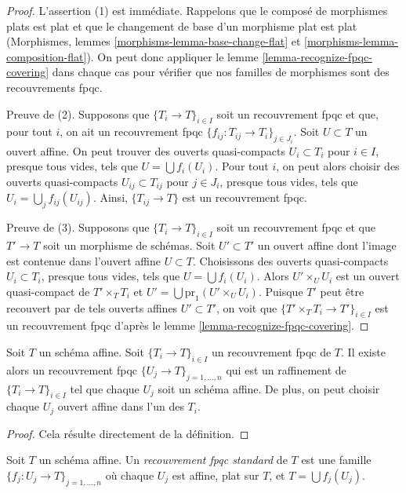 \begin{proof}
L'assertion (1) est immédiate. Rappelons que le composé de morphismes plats
est plat et que le changement de base d'un morphisme plat est plat
(Morphismes, lemmes \ref{morphisms-lemma-base-change-flat} et
\ref{morphisms-lemma-composition-flat}).
On peut donc appliquer le lemme \ref{lemma-recognize-fpqc-covering}
dans chaque cas pour vérifier que nos familles de morphismes sont des recouvrements fpqc.

\medskip\noindent
Preuve de (2). Supposons que $\{T_i \to T\}_{i\in I}$ soit un recouvrement fpqc et que, pour tout
$i$, on ait un recouvrement fpqc $\{f_{ij} : T_{ij} \to T_i\}_{j\in J_i}$.
Soit $U \subset T$ un ouvert affine. On peut trouver
des ouverts quasi-compacts $U_i \subset T_i$ pour $i \in I$, presque tous vides,
tels que $U = \bigcup f_i(U_i)$. Pour tout $i$, on peut alors choisir
des ouverts quasi-compacts $U_{ij} \subset T_{ij}$ pour $j \in J_i$, presque tous vides,
tels que $U_i = \bigcup_j f_{ij}(U_{ij})$. Ainsi,
$\{T_{ij} \to T\}$ est un recouvrement fpqc.

\medskip\noindent
Preuve de (3). Supposons que $\{T_i \to T\}_{i\in I}$ soit un recouvrement fpqc
et que $T' \to T$ soit un morphisme de schémas. Soit $U' \subset T'$ un ouvert affine
dont l'image est contenue dans l'ouvert affine $U \subset T$. Choisissons
des ouverts quasi-compacts $U_i \subset T_i$, presque tous vides,
tels que $U = \bigcup f_i(U_i)$. Alors $U' \times_U U_i$ est
un ouvert quasi-compact de $T' \times_T T_i$ et
$U' = \bigcup \text{pr}_1(U' \times_U U_i)$. Puisque $T'$
peut être recouvert par de tels ouverts affines $U' \subset T'$, on voit
que $\{T' \times_T T_i \to T'\}_{i\in I}$ est un recouvrement fpqc d'après le
lemme \ref{lemma-recognize-fpqc-covering}.
\end{proof}

\begin{lemma}
\label{lemma-fpqc-affine}
Soit $T$ un schéma affine.
Soit $\{T_i \to T\}_{i \in I}$ un recouvrement fpqc de $T$.
Il existe alors un recouvrement fpqc
$\{U_j \to T\}_{j = 1, \ldots, n}$ qui est un raffinement
de $\{T_i \to T\}_{i \in I}$ tel que chaque $U_j$ soit un schéma
affine. De plus, on peut choisir chaque $U_j$ ouvert affine
dans l'un des $T_i$.
\end{lemma}

\begin{proof}
Cela résulte directement de la définition.
\end{proof}

\begin{definition}
\label{definition-standard-fpqc}
Soit $T$ un schéma affine. Un {\it recouvrement fpqc standard}
de $T$ est une famille $\{f_j : U_j \to T\}_{j = 1, \ldots, n}$
où chaque $U_j$ est affine, plat sur $T$, et $T = \bigcup f_j(U_j)$.
\end{definition}

